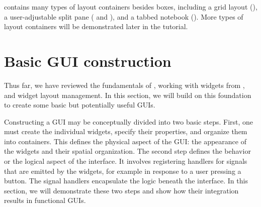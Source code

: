 \documentclass[article,shortnames]{jss}
\begin{document}
 contains many types of layout containers besides boxes,
including 
a grid layout (), a user-adjustable split pane
(
and ), and a tabbed notebook ().
More types of
layout containers will be demonstrated later in the tutorial.




\section{Basic GUI construction}


Thus far, we have reviewed the fundamentals of , working
with
 widgets from , and widget layout management. In
this
section, we will build on this foundation to create some basic but
potentially
useful GUIs. 

Constructing a GUI may be conceptually divided into two basic steps.
First, one must create the individual widgets, specify their
properties,
and organize them into containers. This defines the physical aspect
of the GUI: the appearance of the widgets and their spatial
organization.
The second step defines the behavior or the logical aspect of the
interface. It involves registering handlers for signals that are
emitted
by the widgets, for example in response to a user pressing a button.
The signal handlers encapsulate the logic beneath the interface. In
this
section, we will demonstrate these two steps and show how their
integration
results in functional GUIs.
\end{document}
